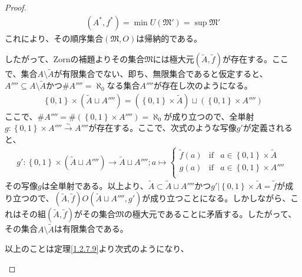 \documentclass[dvipdfmx]{jsarticle}
\begin{document}
\begin{proof}
\begin{align*}
\left( A^{*},f^{*} \right) = \min{U\left( \mathfrak{M}' \right)} = \sup\mathfrak{M}'
\end{align*}
これにより、その順序集合$\left( \mathfrak{M,}O \right)$は帰納的である。\par
したがって、Zornの補題よりその集合$\mathfrak{M}$には極大元$\left( \widetilde{A},\widetilde{f} \right)$が存在する。ここで、集合$A \setminus \widetilde{A}$が有限集合でない、即ち、無限集合であると仮定すると、$A'''' \subseteq A \setminus \widetilde{A}$かつ$\# A'''' = \aleph_{0}$なる集合$A''''$が存在し次のようになる。
\begin{align*}
\left\{ 0,1 \right\} \times \left( \widetilde{A} \sqcup A'''' \right) = \left( \left\{ 0,1 \right\} \times \widetilde{A} \right) \sqcup \left( \left\{ 0,1 \right\} \times A'''' \right)
\end{align*}
ここで、$\# A'''' = \# \left( \left\{ 0,1 \right\} \times A'''' \right) = \aleph_{0}$が成り立つので、全単射$g:\left\{ 0,1 \right\} \times A''''\overset{\sim}{\rightarrow}A''''$が存在する。ここで、次式のような写像$g'$が定義されると、
\begin{align*}
g':\left\{ 0,1 \right\} \times \left( \widetilde{A} \sqcup A'''' \right) \rightarrow \widetilde{A} \sqcup A'''';a \mapsto \left\{ \begin{matrix}
\widetilde{f}(a) & {\mathrm{\mathrm{if}} } & a \in \left\{ 0,1 \right\} \times \widetilde{A} \\
g(a) & {\mathrm{\mathrm{if}} } & a \in \left\{ 0,1 \right\} \times A'''' \\
\end{matrix} \right.\ 
\end{align*}
その写像$g$は全単射である。以上より、$\widetilde{A} \subset \widetilde{A} \sqcup A''''$かつ$g'|\left\{ 0,1 \right\} \times \widetilde{A} = \widetilde{f}$が成り立つので、$\left( \widetilde{A},\widetilde{f} \right)O\left( \widetilde{A} \sqcup A'''',g' \right)$が成り立つことになる。しかしながら、これはその組$\left( \widetilde{A},\widetilde{f} \right)$がその集合$\mathfrak{M}$の極大元であることに矛盾する。したがって、その集合$A \setminus \widetilde{A}$は有限集合である。\par
以上のことは定理\ref{1.2.7.9}より次式のようになり、
\begin{center}
\end{center}
\end{proof}
\end{document}
